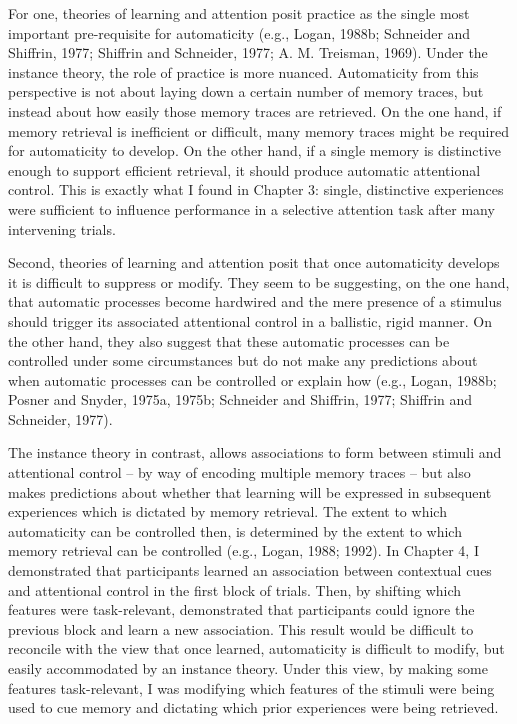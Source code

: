 \documentclass[]{DissertateCUNY}
\begin{document}
For one, theories of learning and attention posit practice as the single
most important pre-requisite for automaticity (e.g., Logan, 1988b;
Schneider and Shiffrin, 1977; Shiffrin and Schneider, 1977; A. M.
Treisman, 1969). Under the instance theory, the role of practice is more
nuanced. Automaticity from this perspective is not about laying down a
certain number of memory traces, but instead about how easily those
memory traces are retrieved. On the one hand, if memory retrieval is
inefficient or difficult, many memory traces might be required for
automaticity to develop. On the other hand, if a single memory is
distinctive enough to support efficient retrieval, it should produce
automatic attentional control. This is exactly what I found in Chapter
3: single, distinctive experiences were sufficient to influence
performance in a selective attention task after many intervening trials.

Second, theories of learning and attention posit that once automaticity
develops it is difficult to suppress or modify. They seem to be
suggesting, on the one hand, that automatic processes become hardwired
and the mere presence of a stimulus should trigger its associated
attentional control in a ballistic, rigid manner. On the other hand,
they also suggest that these automatic processes can be controlled under
some circumstances but do not make any predictions about when automatic
processes can be controlled or explain how (e.g., Logan, 1988b; Posner
and Snyder, 1975a, 1975b; Schneider and Shiffrin, 1977; Shiffrin and
Schneider, 1977).

The instance theory in contrast, allows associations to form between
stimuli and attentional control -- by way of encoding multiple memory
traces -- but also makes predictions about whether that learning will be
expressed in subsequent experiences which is dictated by memory
retrieval. The extent to which automaticity can be controlled then, is
determined by the extent to which memory retrieval can be controlled
(e.g., Logan, 1988; 1992). In Chapter 4, I demonstrated that
participants learned an association between contextual cues and
attentional control in the first block of trials. Then, by shifting
which features were task-relevant, demonstrated that participants could
ignore the previous block and learn a new association. This result would
be difficult to reconcile with the view that once learned, automaticity
is difficult to modify, but easily accommodated by an instance theory.
Under this view, by making some features task-relevant, I was modifying
which features of the stimuli were being used to cue memory and
dictating which prior experiences were being retrieved.
\end{document}
